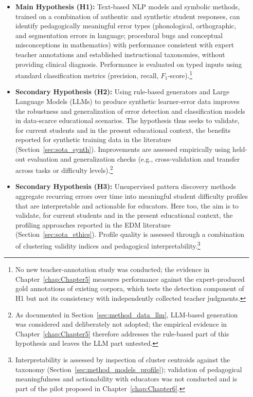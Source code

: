 \begin{itemize}
    \item \textbf{Main Hypothesis (H1):} Text-based NLP models and symbolic methods, trained on a combination of authentic and synthetic student responses, can identify pedagogically meaningful error types (phonological, orthographic, and segmentation errors in language; procedural bugs and conceptual misconceptions in mathematics) with performance consistent with expert teacher annotations and established instructional taxonomies, without providing clinical diagnosis. Performance is evaluated on typed inputs using standard classification metrics (precision, recall, \(F_1\)-score).\footnote{No new teacher-annotation study was conducted; the evidence in Chapter~\ref{chap:Chapter5} measures performance against the expert-produced gold annotations of existing corpora, which tests the detection component of H1 but not its consistency with independently collected teacher judgments.}
    \item \textbf{Secondary Hypothesis (H2):} Using rule-based generators and Large Language Models (LLMs) to produce synthetic learner-error data improves the robustness and generalization of error detection and classification models in data-scarce educational scenarios. The hypothesis thus seeks to validate, for current students and in the present educational context, the benefits reported for synthetic training data in the literature (Section~\ref{sec:sota_synth}). Improvements are assessed empirically using held-out evaluation and generalization checks (e.g., cross-validation and transfer across tasks or difficulty levels).\footnote{As documented in Section~\ref{sec:method_data_llm}, LLM-based generation was considered and deliberately not adopted; the empirical evidence in Chapter~\ref{chap:Chapter5} therefore addresses the rule-based part of this hypothesis and leaves the LLM part untested.}
    \item \textbf{Secondary Hypothesis (H3):} Unsupervised pattern discovery methods aggregate recurring errors over time into meaningful student difficulty profiles that are interpretable and actionable for educators. Here too, the aim is to validate, for current students and in the present educational context, the profiling approaches reported in the EDM literature (Section~\ref{sec:sota_ethics}). Profile quality is assessed through a combination of clustering validity indices and pedagogical interpretability.\footnote{Interpretability is assessed by inspection of cluster centroids against the taxonomy (Section~\ref{sec:method_models_profile}); validation of pedagogical meaningfulness and actionability with educators was not conducted and is part of the pilot proposed in Chapter~\ref{chap:Chapter6}.}
\end{itemize}

